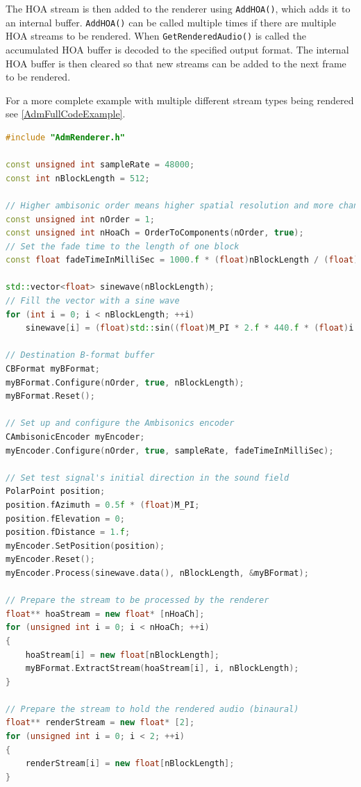 \documentclass[12pt]{report}
\newcommand{\code}[1]{\texttt{#1}}
\begin{document}
The HOA stream is then added to the renderer using \code{AddHOA()}, which adds it to an internal buffer. \code{AddHOA()} can be called multiple times if there are multiple HOA streams to be rendered. When \code{GetRenderedAudio()} is called the accumulated HOA buffer is decoded to the specified output format. The internal HOA buffer is then cleared so that new streams can be added to the next frame to be rendered.

For a more complete example with multiple different stream types being rendered see \cref{AdmFullCodeExample}.

\begin{lstlisting}[language=C++]
#include "AdmRenderer.h"

const unsigned int sampleRate = 48000;
const int nBlockLength = 512;

// Higher ambisonic order means higher spatial resolution and more channels required
const unsigned int nOrder = 1;
const unsigned int nHoaCh = OrderToComponents(nOrder, true);
// Set the fade time to the length of one block
const float fadeTimeInMilliSec = 1000.f * (float)nBlockLength / (float)sampleRate;

std::vector<float> sinewave(nBlockLength);
// Fill the vector with a sine wave
for (int i = 0; i < nBlockLength; ++i)
    sinewave[i] = (float)std::sin((float)M_PI * 2.f * 440.f * (float)i / (float)sampleRate);

// Destination B-format buffer
CBFormat myBFormat;
myBFormat.Configure(nOrder, true, nBlockLength);
myBFormat.Reset();

// Set up and configure the Ambisonics encoder
CAmbisonicEncoder myEncoder;
myEncoder.Configure(nOrder, true, sampleRate, fadeTimeInMilliSec);

// Set test signal's initial direction in the sound field
PolarPoint position;
position.fAzimuth = 0.5f * (float)M_PI;
position.fElevation = 0;
position.fDistance = 1.f;
myEncoder.SetPosition(position);
myEncoder.Reset();
myEncoder.Process(sinewave.data(), nBlockLength, &myBFormat);

// Prepare the stream to be processed by the renderer
float** hoaStream = new float* [nHoaCh];
for (unsigned int i = 0; i < nHoaCh; ++i)
{
    hoaStream[i] = new float[nBlockLength];
    myBFormat.ExtractStream(hoaStream[i], i, nBlockLength);
}

// Prepare the stream to hold the rendered audio (binaural)
float** renderStream = new float* [2];
for (unsigned int i = 0; i < 2; ++i)
{
    renderStream[i] = new float[nBlockLength];
}


\end{lstlisting}
\end{document}
